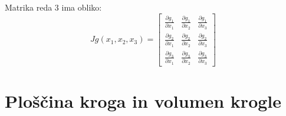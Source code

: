 \documentclass[12pt, a4paper]{article}
\begin{document}
\noindent Matrika reda 3 ima obliko:
$$
Jg(x_1,x_2,x_3)=
\begin{bmatrix}
\frac{\partial g_1}{\partial x_1}  & \frac{\partial g_1}{\partial x_2}  & \frac{\partial g_1}{\partial x_3}  \\
 \frac{\partial g_2}{\partial x_1} & \frac{\partial g_2}{\partial x_2}  & \frac{\partial g_2}{\partial x_3}  \\
 \frac{\partial g_3}{\partial x_1} &  \frac{\partial g_3}{\partial x_2} & \frac{\partial g_3}{\partial x_3} 
\end{bmatrix}
$$



\section{Ploščina kroga in volumen krogle}
\end{document}
